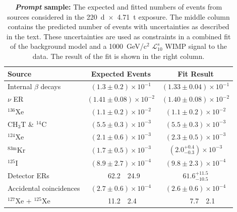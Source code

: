 \setlength{\tabcolsep}{12pt} 
\begin{table}[ht]
    \centering
    \caption{\textbf{\emph{Prompt} sample:}
    The expected and fitted numbers of events from sources considered in the 220~d~$\times$~4.71~t exposure.
    The middle column contains the predicted number of events with uncertainties as described in the text.
    These uncertainties are used as constraints in a combined fit of the background model and a 1000~GeV/c$^2$ $\mathcal{L}^{s}_{10}$ WIMP signal to the data.
    The result of the fit is shown in the right column.}
    \begin{tabular}{l
            r@{$\,\pm\,$}l
            r@{$\,\pm\,$}l}
     \hline 
     \hline 
     Source & \multicolumn{2}{c}{Expected Events} & \multicolumn{2}{c}{Fit Result} \\ \hline
     Internal $\beta$ decays          & \multicolumn{2}{c}{$(1.3 \pm 0.2) \times 10^{-1}$} & \multicolumn{2}{c}{$(1.33 \pm 0.04) \times 10^{-1}$} \\
     $\nu$ ER                         & \multicolumn{2}{c}{$(1.41 \pm 0.08) \times 10^{-2}$} & \multicolumn{2}{c}{$(1.40 \pm 0.08) \times 10^{-2}$} \\
     $^{136}$Xe                       & \multicolumn{2}{c}{$(1.1 \pm 0.2) \times 10^{-2}$}  & \multicolumn{2}{c}{$(1.1 \pm 0.2) \times 10^{-2}$} \\
     CH$_3$T \& $^{14}$C              & \multicolumn{2}{c}{$(5.5 \pm 0.3) \times 10^{-3}$}     & \multicolumn{2}{c}{$(5.5 \pm 0.3) \times 10^{-3}$} \\
     $^{124}$Xe                      & \multicolumn{2}{c}{$(2.1 \pm 0.6) \times 10^{-3}$} & \multicolumn{2}{c}{$(2.3 \pm 0.5) \times 10^{-3}$} \\
     $^{83\mathrm{m}}$Kr             & \multicolumn{2}{c}{$(1.7 \pm 0.5) \times 10^{-3}$} & \multicolumn{2}{c}{$\left(2.0^{+0.4}_{-0.3}\right) \times 10^{-3}$} \\
     $^{125}$I                       & \multicolumn{2}{c}{$(8.9 \pm 2.7) \times 10^{-4}$} & \multicolumn{2}{c}{$(9.8 \pm 2.3) \times 10^{-4}$} \\
     Detector ERs                    & $\,\,\,$62.2     & 24.9   & \multicolumn{2}{c}{$61.6^{+11.5}_{-10.5}$}$\,\,\,\,\,\,$ \\
     Accidental coincidences         & \multicolumn{2}{c}{$(2.7 \pm 0.6) \times 10^{-4}$} & \multicolumn{2}{c}{$(2.6 \pm 0.6) \times 10^{-4}$} \\
     $^{127}$Xe + $^{125}$Xe         & 11.2     & 2.4    & $\,\,\,\,\,\,$7.7 & 2.1 \\

\end{tabular}
\end{table}
